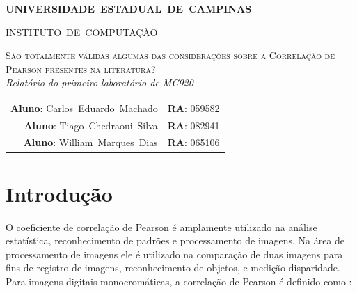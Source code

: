 \documentclass[10pt,a4paper]{article}
\begin{document}
\begin{titlepage}
\thispagestyle{empty}
  \begin{center} {\large \textbf{UNIVERSIDADE~ESTADUAL~DE~CAMPINAS}} \end{center}
  \begin{center} {\large INSTITUTO~DE~COMPUTAÇÃO}                    \end{center}
  \vspace{0.1cm}
  \begin{center}
  \begin{minipage}[tl]{31mm}
  \end{minipage}
  \end{center}
  \vspace{0.3cm}
  \begin{center} 
    {\large \textsc{São totalmente válidas algumas das considerações sobre a
Correlação de Pearson presentes na literatura?  }} 
    \\\vspace{0.5cm}
    {\textsl{Relatório do primeiro laboratório de MC920}}
    \\\vspace{1cm}
    \begin{tabular}{rl}
	  \textbf{Aluno}:   Carlos~Eduardo~Machado &  
	  \textbf{RA}:          059582 \\ 
	  \textbf{Aluno}:        Tiago~Chedraoui~Silva & 
	  \textbf{RA}:        082941 \\
	  \textbf{Aluno}:        William~Marques~Dias & 
	  \textbf{RA}:        065106 \\
	\end{tabular}
  \end{center}
  \vspace{0.5cm}

  \begin{abstract}
O coeficiente de correlação de Pearson é amplamente usado para
comparar imagens, contudo ele apresenta sérias limitações. Esse
trabalho consistiu na validação da análise realizada no Artigo ''The
Ineffectiveness of the Correlation Coefficient for Image Comparisons''.
  \end{abstract}
  \tableofcontents
\end{titlepage} 

\vspace{2mm}
\newpage

\section{Introdução}
O coeficiente de correlação de Pearson é amplamente
utilizado na análise estatística, reconhecimento de padrões e
processamento de imagens.
Na área de processamento de imagens ele é utilizado na comparação de
duas imagens para fins de registro de imagens, reconhecimento de
objetos, e medição disparidade. Para imagens digitais monocromáticas, a correlação de Pearson é definido como :
\end{document}
